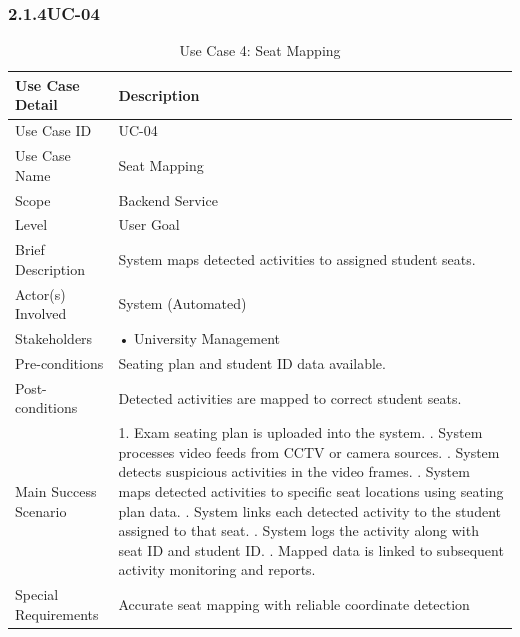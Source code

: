 \clearpage

\subsubsection*{2.1.4\quad UC-04}
\begin{longtable}{|p{5cm}|p{10cm}|}
\caption{Use Case 4: Seat Mapping}\label{uc04} \\
\hline
\textbf{Use Case Detail} & \textbf{Description} \\ \hline
Use Case ID & UC-04 \\ \hline
Use Case Name & Seat Mapping \\ \hline
Scope & Backend Service \\ \hline
Level & User Goal \\ \hline
Brief Description & System maps detected activities to assigned student seats. \\ \hline
Actor(s) Involved & System (Automated) \\ \hline
Stakeholders & • University Management \\ \hline
Pre-conditions & Seating plan and student ID data available. \\ \hline
Post-conditions & Detected activities are mapped to correct student seats. \\ \hline
Main Success Scenario & 
1. Exam seating plan is uploaded into the system. \newline
2. System processes video feeds from CCTV or camera sources. \newline
3. System detects suspicious activities in the video frames. \newline
4. System maps detected activities to specific seat locations using seating plan data. \newline
5. System links each detected activity to the student assigned to that seat. \newline
6. System logs the activity along with seat ID and student ID. \newline
7. Mapped data is linked to subsequent activity monitoring and reports. \\ \hline
Special Requirements & Accurate seat mapping with reliable coordinate detection \\ \hline


\end{longtable}

\clearpage


